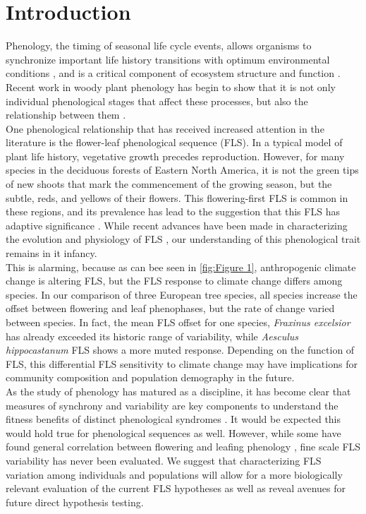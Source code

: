\documentclass[12pt]{article}\usepackage[]{graphicx}\usepackage[]{color}
\begin{document}
\section*{Introduction}
\indent \indent Phenology, the timing of seasonal life cycle events, allows organisms to synchronize important life history transitions with optimum environmental conditions \citep{Forrest2010}, and is a critical component of ecosystem structure and function \citep{Cleland2007,Piao2007}. Recent work in woody plant phenology has begin to show that it is not only individual phenological stages that affect these processes, but also the relationship between them \citep{Ettinger2018}.\\
\indent One phenological relationship that has received increased attention in the literature is the flower-leaf phenological sequence (FLS). In a typical model of plant life history, vegetative growth precedes reproduction. However, for many species in the deciduous forests of Eastern North America, it is not the green tips of new shoots that mark the commencement of the growing season, but the subtle, reds, and yellows of their flowers. This flowering-first FLS is common in these regions, and its prevalence has lead to the suggestion that this FLS has adaptive significance \citep{Rathcke_1985}. %
While recent advances have been made in characterizing the evolution and physiology of FLS \citep{Gougherty2018,Savage2019}, our understanding of this phenological trait remains in it infancy.\\ %
\indent This is alarming, because as can bee seen in \ref{fig:Figure 1}, anthropogenic climate change is altering FLS, but the FLS response to climate change differs among species. In our comparison of three European tree species, all species increase the offset between flowering and leaf phenophases, but the rate of change varied between species. In fact, the mean FLS offset for one species, \textit{Fraxinus excelsior} has already exceeded its historic range of variability, while \textit{Aesculus hippocastanum} FLS shows a more muted response. Depending on the function of FLS, this differential FLS sensitivity to climate change may have implications for community composition and population demography in the future.\\
\indent As the study of phenology has matured as a discipline, it has become clear that measures of synchrony and variability are key components to understand the fitness benefits of distinct phenological syndromes \citep{}. It would be expected this would hold true for phenological sequences as well. However, while some have found general correlation between flowering and leafing phenology \citep{Lechowicz_1995, Ettinger2018}, fine scale FLS variability has never been evaluated. We suggest that characterizing FLS variation among individuals and populations will allow for a more biologically relevant evaluation of the current FLS hypotheses as well as reveal avenues for future direct hypothesis testing.\\
\end{document}

